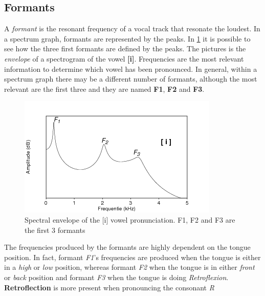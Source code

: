 \subsection{Formants}
\label{sub:formants}
A \textit{formant} is the resonant frequency of a vocal track that resonate the loudest. In a spectrum graph, formants are represented by the peaks. In \ref{fig:peaks_formants} it is possible to see how the three first formants are defined by the peaks. The pictures is the \textit{envelope} of a spectrogram of the vowel \textbf{[i]}. Frequencies are the most relevant information to determine which vowel has been pronounced. In general, within a spectrum graph there may be a different number of formants, although the most relevant are the first three and they are named \textbf{F1}, \textbf{F2} and \textbf{F3}.

\begin{figure}[!ht]
    \centering
    \includegraphics[scale=0.6]{Figures/peaks_formants.png}
    \caption{Spectral envelope of the [i] vowel pronunciation. F1, F2 and F3 are the first 3 formants \cite{formants_peaks}}
    \label{fig:peaks_formants}
\end{figure}

\noindent The frequencies produced by the formants are highly dependent on the tongue position. In fact, formant \textit{F1}'s frequencies are produced when the tongue is either in a \textit{high} or \textit{low} position, whereas formant \textit{F2} when the tongue is in either \textit{front} or \textit{back} position and formant \textit{F3} when the tongue is doing \textit{Retroflexion}. \textbf{Retroflection} is more present when pronouncing the consonant \textit{R}


